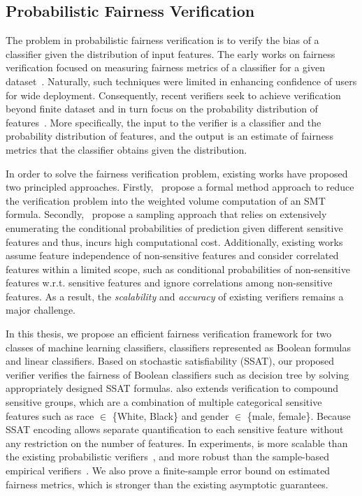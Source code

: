 \subsection*{Probabilistic Fairness Verification} The problem in probabilistic fairness verification is to verify the bias of a classifier given the distribution of input features. The early works on fairness verification focused on measuring fairness metrics of a classifier for a given dataset~\cite{aif360-oct-2018}. Naturally, such techniques were limited in enhancing confidence of users for wide deployment. Consequently, recent verifiers seek to achieve verification beyond  finite dataset and in turn focus on the  probability distribution of features~\cite{albarghouthi2017fairsquare, bastani2019probabilistic}.  More specifically, the input to the verifier is a classifier and  the probability distribution of features, and the output is an estimate of fairness metrics that the classifier obtains given the distribution.


In order to solve the fairness verification problem, existing works have proposed two principled approaches.	Firstly,~\cite{albarghouthi2017fairsquare} propose a formal method approach to reduce the verification problem into the weighted volume computation of an SMT formula. Secondly,~\cite{bastani2019probabilistic} propose a sampling approach that relies on extensively enumerating the conditional probabilities of prediction given different sensitive features and thus, incurs high computational cost. Additionally, existing works assume feature independence of non-sensitive features and consider correlated features within a limited scope, such as conditional probabilities of non-sensitive features w.r.t. sensitive features and ignore correlations among non-sensitive features. As a result, the \textit{scalability} and \textit{accuracy} of existing  verifiers remains a major challenge.


In this thesis, we propose an efficient fairness verification framework for two classes of machine learning classifiers, classifiers represented as Boolean formulas and linear classifiers. Based on stochastic satisfiability (SSAT)\cite{littman2001stochastic}, our proposed verifier {\justicia} verifies the fairness of Boolean classifiers such as decision tree by solving appropriately designed SSAT formulas. {\justicia} also extends verification to compound sensitive groups, which are a combination of multiple categorical sensitive features such as race $ \in $ \{White, Black\} and gender $ \in $ \{male, female\}. Because SSAT encoding allows separate quantification to each sensitive feature without any restriction on the number of features. In experiments, {\justicia} is more scalable than the existing probabilistic verifiers~\cite{albarghouthi2017fairsquare,bastani2019probabilistic}, and more robust than the sample-based empirical verifiers~\cite{aif360-oct-2018}. We also prove a finite-sample error bound on estimated fairness metrics, which is stronger than the existing asymptotic guarantees.


